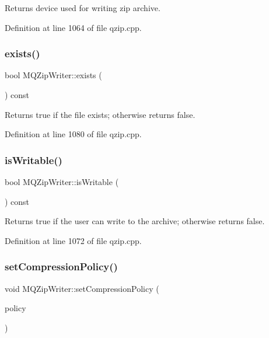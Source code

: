 Returns device used for writing zip archive. 

Definition at line 1064 of file qzip.\+cpp.

\mbox{\label{class_m_q_zip_writer_ac3ed7d79e04aca62ecdb0f7222422ec2}} 
\subsubsection{\texorpdfstring{exists()}{exists()}}
{\footnotesize\ttfamily bool M\+Q\+Zip\+Writer\+::exists (\begin{DoxyParamCaption}{ }\end{DoxyParamCaption}) const}

Returns true if the file exists; otherwise returns false. 

Definition at line 1080 of file qzip.\+cpp.

\mbox{\label{class_m_q_zip_writer_a96cf59b1f12b11fcee87f1e4e6c647a9}} 
\subsubsection{\texorpdfstring{is\+Writable()}{isWritable()}}
{\footnotesize\ttfamily bool M\+Q\+Zip\+Writer\+::is\+Writable (\begin{DoxyParamCaption}{ }\end{DoxyParamCaption}) const}

Returns true if the user can write to the archive; otherwise returns false. 

Definition at line 1072 of file qzip.\+cpp.

\mbox{\label{class_m_q_zip_writer_ab4f5f12ae8df67674ec0f3d30d97313f}} 
\subsubsection{\texorpdfstring{set\+Compression\+Policy()}{setCompressionPolicy()}}
{\footnotesize\ttfamily void M\+Q\+Zip\+Writer\+::set\+Compression\+Policy (\begin{DoxyParamCaption}\item[{Compression\+Policy}]{policy }\end{DoxyParamCaption})}


